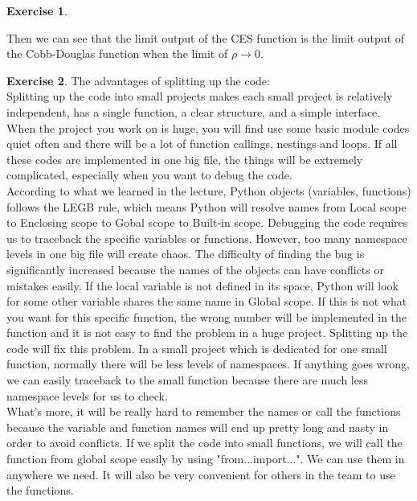 \documentclass[11pt,a4paper,leqno]{article}
\theoremstyle{definition}
\newtheorem{exercise}{Exercise}
\begin{document}
\begin{exercise}
\begin{enumerate}
        Then we can see that the limit output of the CES function is the limit output of the Cobb-Douglas function when the limit of $\rho \rightarrow 0$.

    \end{enumerate}
\end{exercise}


\begin{exercise}
    The advantages of splitting up the code:\\

    Splitting up the code into small projects makes each small project is relatively independent, has a single function, a clear structure, and a simple interface. When the project you work on is huge, you will find use some basic module codes quiet often and there will be a lot of function callings, nestings and loops. If all these codes are implemented in one big file, the things will be extremely complicated, especially when you want to debug the code. \\

    According to what we learned in the lecture, Python objects (variables, functions) follows the LEGB rule, which means Python will resolve names from Local scope to Enclosing scope to Gobal scope to Built-in scope. Debugging the code requires us to traceback the specific variables or functions. However, too many namespace levels in one big file will create chaos. The difficulty of finding the bug is significantly increased because the names of the objects can have conflicts or mistakes easily. If the local variable is not defined in its space, Python will look for some other variable shares the same name in Global scope. If this is not what you want for this specific function, the wrong number will be implemented in the function and it is not easy to find the problem in a huge project. Splitting up the code will fix this problem. In a small project which is dedicated for one small function, normally there will be less levels of namespaces. If anything goes wrong, we can easily traceback to the small function because there are much less namespace levels for us to check. \\

    What's more, it will be really hard to remember the names or call the functions because the variable and function names will end up pretty long and nasty in order to avoid conflicts. If we split the code into small functions, we will call the function from global scope easily by using "from...import...". We can use them in anywhere we need. It will also be very convenient for others in the team to use the functions.\\


\end{exercise}
\end{document}
